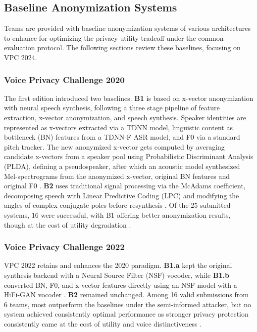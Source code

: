 \documentclass[12pt,leqno,a4paper]{article}
\begin{document}
\subsection{Baseline Anonymization Systems}
Teams are provided with baseline anonymization systems of various architectures to enhance for optimizing the privacy-utility 
tradeoff under the common evaluation protocol. 
The following sections review these baselines, focusing on VPC 2024.

\subsubsection{Voice Privacy Challenge 2020}
The first edition introduced two baselines. \textbf{B1} is based on x-vector 
anonymization with neural speech synthesis, following a three stage 
pipeline of feature extraction, x-vector anonymization, and speech 
synthesis. Speaker identities are represented as x-vectors extracted via a TDNN model, linguistic content as 
bottleneck (BN) features from a TDNN-F ASR model, 
and F0 via a standard pitch tracker. The new anonymized x-vector gets 
computed by averaging candidate x-vectors from a speaker pool using 
Probabilistic Discriminant Analysis (PLDA), defining a pseudospeaker, after which an acoustic model 
synthesized Mel-spectrograms from the anonymized x-vector, original 
BN features and original F0 \citep{tomashenko_voiceprivacy_nodate}. 
\textbf{B2} uses traditional signal processing via the McAdams coefficient, 
decomposing speech with Linear Predictive Coding (LPC) and modifying the angles of complex-conjugate poles before resynthesis 
\citep{tomashenko_voiceprivacy_nodate}. Of the 25 submitted systems, 
16 were successful, with B1 offering better anonymization 
results, though at the cost of utility degradation \citep{panariello_voiceprivacy_2024, tomashenko_voiceprivacy_2022-1}.

\subsubsection{Voice Privacy Challenge 2022}
VPC 2022 retains and enhances the 2020 paradigm. \textbf{B1.a} kept the 
original synthesis backend with a Neural Source Filter (NSF) vocoder, while \textbf{B1.b} converted 
BN, F0, and x-vector features directly using an NSF model with a 
HiFi-GAN vocoder \citep{tomashenko2022voiceprivacy2022challengeevaluation}. 
\textbf{B2} remained unchanged. Among 16 valid submissions from 6 teams, most 
outperform the baselines under the semi-informed attacker, but no 
system achieved consistently optimal performance as stronger privacy 
protection consistently came at the cost of utility and voice 
distinctiveness \citep{panariello_voiceprivacy_2024, 
tomashenko_voiceprivacy_2022}.
\end{document}
